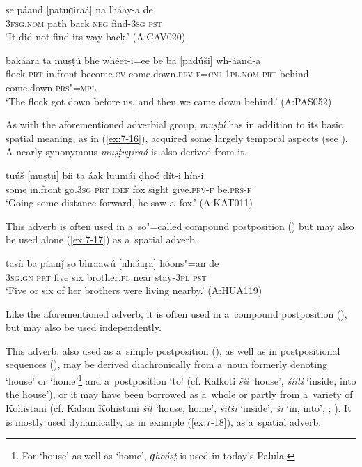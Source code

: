 \begin{exe}
\ex
\label{ex:7-14}
\gll se páand [patuɡiraá] na lháay-a de  \\
\textsc{3fsg.nom} path back  \textsc{neg} find-\textsc{3sg} \textsc{pst}\\
\glt `It did not find its way back.' (A:CAV020)

\ex
\label{ex:7-15}
\gll bakáara ta muṣṭú bhe whéet-i=ee  be ba [padúši] wh-áand-a \\
flock \textsc{prt} in.front become.\textsc{cv} come.down.\textsc{pfv-f=cnj} \textsc{1pl.nom} \textsc{prt} behind come.down-\textsc{prs"=mpl}\\
\glt `The flock got down before us, and then we came down behind.' (A:PAS052)
\end{exe}

 As with the aforementioned adverbial group, \textit{muṣṭú} has in addition to its basic spatial meaning, as in (\ref{ex:7-16}), acquired some largely temporal aspects (see ). A nearly synonymous \textit{muṣṭuɡiraá} is also derived from it. 

\begin{exe}
\ex
\label{ex:7-16}
\gll tuúš [muṣṭú] bíi ta áak luumái ḍhoó dít-i hín-i \\
some in.front go.\textsc{3sg} \textsc{prt} \textsc{idef} fox sight give.\textsc{pfv-f} be.\textsc{prs-f}\\
\glt `Going some distance forward, he saw a~fox.' (A:KAT011)
\end{exe}

 This adverb is often used in a~so"=called compound postposition () but may also be used alone (\ref{ex:7-17}) as a~spatial adverb.
\begin{exe}
\ex
\label{ex:7-17}
\gll tasíi ba páanǰ ṣo bhraawú [nhiáaṛa] hóons"=an de \\
\textsc{3sg.gn} \textsc{prt} five six brother.\textsc{pl} near stay-\textsc{3pl} \textsc{pst}\\
\glt `Five or six of her brothers were living nearby.' (A:HUA119)
\end{exe}

 Like the aforementioned adverb, it is often used in a~compound postposition (), but may also be used independently.

 This adverb, also used as a~simple postposition
(), as well as in postpositional sequences (), may be derived diachronically from
a~noun formerly denoting `house' or `home'\footnote{For `house' as well as `home',
  \textit{ɡhoóṣṭ} is used in today's Palula.} and a~postposition `to' (cf. Kalkoti
\textit{šíi} `house', \textit{šíiti} `inside, into the house'), or it may have been borrowed
as a~whole or partly from a~variety of Kohistani (cf. Kalam Kohistani \textit{šiṭ} `house, home',
\textit{šiṭši} `inside', \textit{ši} `in, into', \citealt[119]{baart1997}; \citeyear[76]{baart1999a}). It is mostly used
dynamically, as in example (\ref{ex:7-18}), as a~spatial adverb.

